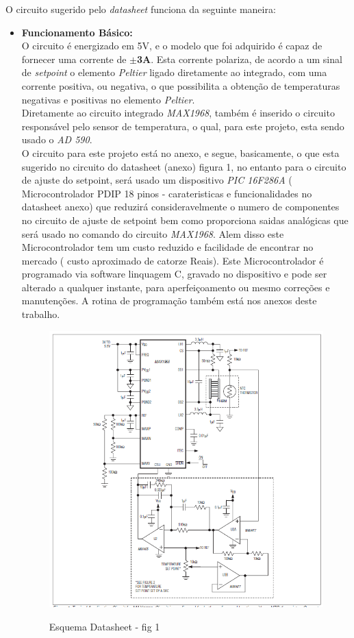 O circuito sugerido pelo \emph{datasheet} funciona da seguinte maneira: \\
\begin{itemize}
\item \textbf{Funcionamento Básico:}\\

O circuito é energizado em 5V, e o modelo que foi adquirido é capaz de fornecer uma corrente de \textbf{$ \pm $3A}. Esta corrente polariza, de acordo a um sinal de \emph{setpoint} o elemento \emph{Peltier} ligado diretamente ao integrado, com uma corrente positiva, ou negativa, o que possibilita a obtenção de temperaturas negativas e positivas no elemento \emph{Peltier}. \\
Diretamente ao circuito integrado \emph{MAX1968}, também é inserido o circuito responsável pelo sensor de temperatura, o qual, para este projeto, esta sendo usado o \emph{AD 590}.\\
O circuito para este projeto está no anexo, e segue, basicamente, o que esta sugerido no circuito do datasheet (anexo) figura 1, no entanto para o circuito de ajuste do setpoint, será usado um dispositivo \emph{PIC 16F286A} ( Microcontrolador PDIP 18 pinos - carateristicas e funcionalidades no datasheet anexo) que reduzirá consideravelmente o numero de componentes no circuito de ajuste de setpoint bem como proporciona saidas analógicas que será usado no comando do circuito \emph{MAX1968}. Alem disso este Microcontrolador tem um custo reduzido e facilidade de encontrar no mercado ( custo aproximado de catorze Reais).
Este Microcontrolador é programado via software linquagem C, gravado no  dispositivo e pode ser alterado a qualquer instante, para aperfeiçoamento ou mesmo correções e manutenções. A rotina de programação também está nos anexos deste trabalho. \\

\begin{figure}[H]
		\centering
		\includegraphics[width=0.7\linewidth]{./ima/esquemaDataSheet01.png}
		\label{fig:esq DataSheet}
		\caption{Esquema Datasheet - fig 1}
	\end{figure}


\end{itemize}
